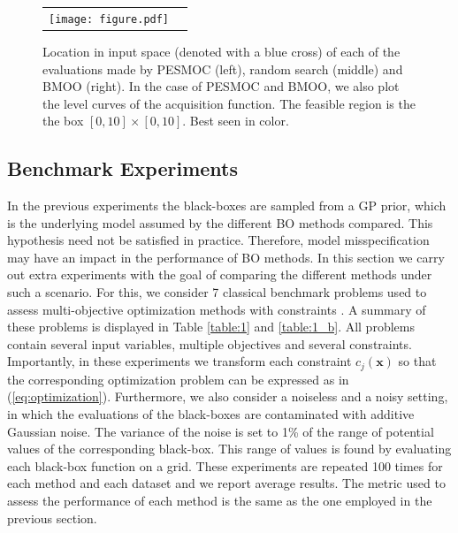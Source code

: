\documentclass[review,preprint,12pt]{elsarticle}
\begin{document}
\begin{figure}[htb]
	\begin{tabular}{cc}
	\texttt{[image: figure.pdf]}
	\end{tabular}
	\caption{{\small Location in input space (denoted with a blue cross) of each of the evaluations made by PESMOC 
		(left), random search (middle) and BMOO (right). In the case of PESMOC and BMOO, we also plot the level 
		curves of the acquisition function. The feasible region is the the box $[0,10] \times [0,10]$. Best seen in color. }}
	\label{fig:evaluations}
\end{figure}

\subsection{Benchmark Experiments}

In the previous experiments the black-boxes are sampled from a GP prior, which is the underlying model assumed by the different
BO methods compared. This hypothesis need not be satisfied in practice. Therefore, model misspecification may have an impact in 
the performance of BO methods. In this section we carry out extra experiments with the goal of comparing the different methods 
under such a scenario. For this, we consider 7 classical benchmark problems used to assess multi-objective optimization methods 
with constraints \citep{chafekar2003constrained,deb2002fast}. A summary of these problems is displayed in Table \ref{table:1} and \ref{table:1_b}. 
All problems contain several input variables, multiple objectives and several constraints. Importantly, in these experiments 
we transform each constraint $c_j(\mathbf{x})$ so that the corresponding optimization problem can be expressed as 
in (\ref{eq:optimization}). Furthermore, we also consider a noiseless and a noisy setting, in which the evaluations of the
black-boxes are contaminated with additive Gaussian noise. The variance of the noise is set to 1\% of the range of potential 
values of the corresponding black-box. This range of values is found by evaluating each black-box function on a grid.
These experiments are repeated 100 times for each method and each dataset and we report average results. The metric used
to assess the performance of each method is the same as the one employed in the previous section.
\end{document}
